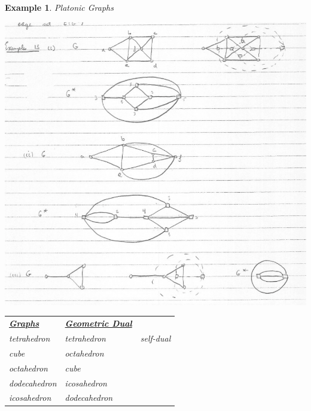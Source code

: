 \documentclass[12pt]{article}
\newtheorem{example}{Example}
\begin{document}
\begin{example}

	Platonic Graphs
	\begin{center}
		\includegraphics[scale=0.5]{dualgraph}
	\end{center}


	\begin{table}[H]
		\begin{center}
			\begin{tabular}{lll}
				\uline{\textbf{Graphs}} & \uline{\textbf{Geometric Dual}} &           \\
				tetrahedron             & tetrahedron                     & self-dual \\
				cube                    & octahedron                      &           \\
				octahedron              & cube                            &           \\
				dodecahedron            & icosahedron                     &           \\
				icosahedron             & dodecahedron                    &
			\end{tabular}
		\end{center}
	\end{table}

\end{example}
\end{document}
